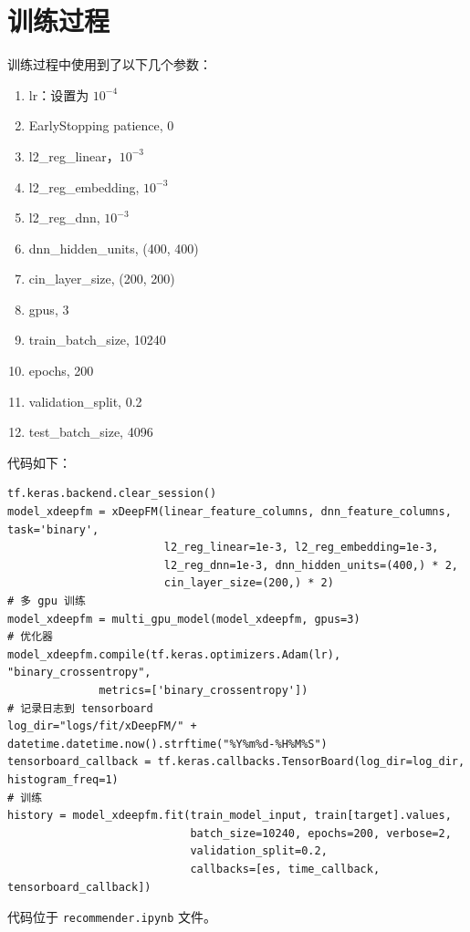 \documentclass[degree=project,degree-type=project,cjk-font=noto]{thuthesis}
\begin{document}
\section{训练过程}
训练过程中使用到了以下几个参数：

\begin{enumerate}
  \item lr：设置为 $10^{-4}$
  \item EarlyStopping patience, 0
  \item l2\_reg\_linear，$10^{-3}$
  \item l2\_reg\_embedding, $10^{-3}$
  \item l2\_reg\_dnn, $10^{-3}$
  \item dnn\_hidden\_units, (400, 400)
  \item cin\_layer\_size, (200, 200)
  \item gpus, 3
  \item train\_batch\_size, 10240
  \item epochs, 200
  \item validation\_split, 0.2
  \item test\_batch\_size, 4096
\end{enumerate}

代码如下：

  \begin{verbatim}
tf.keras.backend.clear_session()
model_xdeepfm = xDeepFM(linear_feature_columns, dnn_feature_columns, task='binary',
                        l2_reg_linear=1e-3, l2_reg_embedding=1e-3,
                        l2_reg_dnn=1e-3, dnn_hidden_units=(400,) * 2,
                        cin_layer_size=(200,) * 2)
# 多 gpu 训练
model_xdeepfm = multi_gpu_model(model_xdeepfm, gpus=3)
# 优化器
model_xdeepfm.compile(tf.keras.optimizers.Adam(lr), "binary_crossentropy",
              metrics=['binary_crossentropy'])
# 记录日志到 tensorboard
log_dir="logs/fit/xDeepFM/" + datetime.datetime.now().strftime("%Y%m%d-%H%M%S")
tensorboard_callback = tf.keras.callbacks.TensorBoard(log_dir=log_dir, histogram_freq=1)
# 训练
history = model_xdeepfm.fit(train_model_input, train[target].values,
                            batch_size=10240, epochs=200, verbose=2,
                            validation_split=0.2,
                            callbacks=[es, time_callback, tensorboard_callback])
  \end{verbatim}


代码位于 \texttt{recommender.ipynb} 文件。
\end{document}
